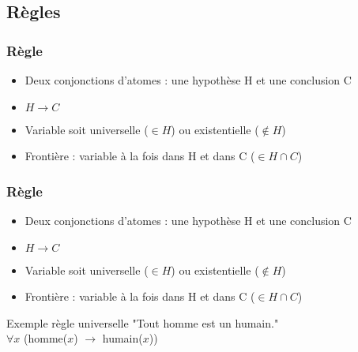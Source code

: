 
\subsection{Règles}
\begin{frame}[t]
	\frametitle{Règle}
	\vspace{10mm}
	\begin{center}
	\begin{itemize}
		\item Deux conjonctions d'atomes : une hypothèse H et une conclusion C
		\item $H \rightarrow C$
		\item Variable soit universelle ($\in H$) ou existentielle ($\notin H$)
		\item Frontière : variable à la fois dans H et dans C ($\in H \cap C$)\\
	\end{itemize}
	\end{center}
\end{frame}

\begin{frame}[t]
	\frametitle{Règle}
	\vspace{10mm}
	\begin{center}
	\begin{itemize}
		\item Deux conjonctions d'atomes : une hypothèse H et une conclusion C
		\item $H \rightarrow C$
		\item Variable soit universelle ($\in H$) ou existentielle ($\notin H$)
		\item Frontière : variable à la fois dans H et dans C ($\in H \cap C$)\\
	\end{itemize}

	\begin{exampleblock}{Exemple règle universelle}
		"Tout homme est un humain."\\
		$\forall x$ (homme($x$) $\rightarrow$ humain($x$))
	\end{exampleblock}

	\end{center}
\end{frame}


